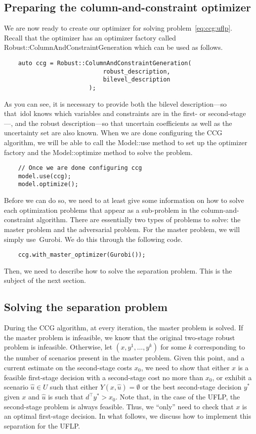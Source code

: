 \subsection{Preparing the column-and-constraint optimizer}

We are now ready to create our optimizer for solving
problem~\eqref{eq:ccg:uflp}. Recall that the optimizer has an optimizer
factory called \textsf{Robust::ColumnAndConstraintGeneration} which can be
used as follows. 
%
\begin{lstlisting}
    auto ccg = Robust::ColumnAndConstraintGeneration(
                            robust_description,
                            bilevel_description
                        );
\end{lstlisting}
As you can see, it is necessary to provide both the bilevel description---so
that~\textsf{idol} knows which variables and constraints are in the first- or
second-stage---, and the robust description---so that uncertain coefficients
as well as the uncertainty set are also known. When we are done configuring
the CCG algorithm, we will be able to call the \textsf{Model::use} method to
set up the optimizer factory and the \textsf{Model::optimize} method to solve
the problem.
%
\begin{lstlisting}
    // Once we are done configuring ccg
    model.use(ccg);
    model.optimize();
\end{lstlisting}
Before we can do so, we need to at least give some information on how to solve
each optimization problems that appear as a sub-problem in the
column-and-constraint algorithm. There are essentially two types of problems
to solve: the master problem and the adversarial problem. For the master
problem, we will simply use~\textsf{Gurobi}. We do this through the following
code.
%
\begin{lstlisting}
    ccg.with_master_optimizer(Gurobi());
\end{lstlisting}
Then, we need to describe how to solve the separation problem. This is the
subject of the next section.

\subsection{Solving the separation problem}

During the CCG algorithm, at every iteration, the master problem is solved. If
the master problem is infeasible, we know that the original two-stage robust
problem is infeasible. Otherwise, let $(x,y^1,\dotsc,y^k)$ for some $k$
corresponding to the number of scenarios present in the master problem. Given
this point, and a current estimate on the second-stage costs $x_0$, we need to
show that either $x$ is a feasible first-stage decision with a second-stage
cost no more than $x_0$, or exhibit a scenario $\hat{u}\in U$ such that either
$Y(x,\hat{u}) = \emptyset$ or the best second-stage decision $y^*$ given $x$
and $\hat{u}$ is such that $d^\top y^* > x_0$. Note that, in the case of the
UFLP, the second-stage problem is always feasible. Thus, we ``only'' need to
check that $x$ is an optimal first-stage decision. In what follows, we discuss
how to implement this separation for the UFLP. 

